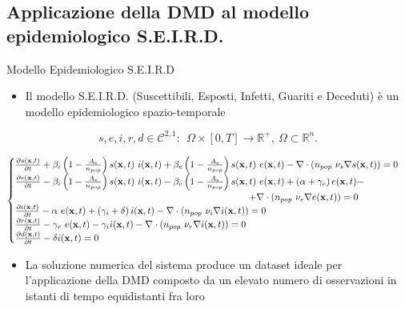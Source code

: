 \documentclass[serif]{beamer}
\newcommand{\R}{\mathbb{R}}
\begin{document}
\subsection{Applicazione della DMD al modello epidemiologico S.E.I.R.D.}
\begin{frame}{Modello Epidemiologico S.E.I.R.D}
\begin{itemize}
    \item Il modello S.E.I.R.D. (Suscettibili, Esposti, Infetti, Guariti e Deceduti) è un modello epidemiologico spazio-temporale
\end{itemize}
\[s,e,i,r,d \in \mathscr{C}^{2,1}: \ \ \Omega \times [0,T]  \rightarrow \R^+, \ \Omega \subset \R^n. \]
\begin{tiny}
\begin{equation*}
\begin{cases}
\frac{\partial s(\mathbf{x},t)}{\partial t}+ \beta_i \left(1-\frac{A_e}{n_{pop}} \right)s(\mathbf{x},t) \ i(\mathbf{x},t) + \beta_e \left(1-\frac{A_e}{n_{pop}} \right)s(\mathbf{x},t)  \ e(\mathbf{x},t)  - \nabla \cdot (n_{pop} \  \nu_s \nabla s(\mathbf{x},t))=0 \\
\frac{\partial e(\mathbf{x},t)}{\partial t} - \beta_i \left(1-\frac{A_e}{n_{pop}} \right)s(\mathbf{x},t) \ i(\mathbf{x},t) - \beta_e \left(1-\frac{A_e}{n_{pop}} \right)s(\mathbf{x},t) \ e(\mathbf{x},t)  + \left( \alpha + \gamma_e \right)e(\mathbf{x},t) - \\ \hspace{8.7cm} + \nabla \cdot (n_{pop} \  \nu_e \nabla e(\mathbf{x},t))=0 \\
\frac{\partial i(\mathbf{x},t)}{\partial t} - \alpha \  e(\mathbf{x},t) + \left( \gamma_i + \delta \right) i(\mathbf{x},t) - \nabla \cdot \left( n_{pop} \ \nu_i \nabla i(\mathbf{x},t) \right) =0 \\
\frac{ \partial r(\mathbf{x},t)}{ \partial t} - \gamma_e \  e(\mathbf{x},t) - \gamma_i i(\mathbf{x},t) - \nabla \cdot \left(n_{pop} \ \nu_r \nabla i(\mathbf{x},t) \right) = 0 \\
\frac{ \partial d(\mathbf{x},t)}{ \partial t} - \delta i(\mathbf{x},t) =0 \\
\end{cases}
\end{equation*}
\end{tiny}

\begin{itemize}
    \item     La soluzione numerica del sistema produce un dataset ideale per l'applicazione della DMD composto da un elevato numero di osservazioni in istanti di tempo equidistanti fra loro
\end{itemize}
\end{frame}
\end{document}
